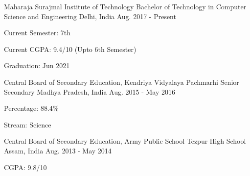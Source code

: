 

\begin{cventries}

  \cventry
    {Maharaja Surajmal Institute of Technology} %
    {Bachelor of Technology in Computer Science and Engineering} %
    {Delhi, India} %
    {Aug. 2017 - Present} %
    {
      \begin{cvitems} %
        \item {Current Semester: 7th}
        \item {Current CGPA: 9.4/10 (Upto 6th Semester)}
        \item {Graduation: Jun 2021}
      \end{cvitems}
    }

  \cventry
    {Central Board of Secondary Education, Kendriya Vidyalaya Pachmarhi} %
    {Senior Secondary} %
    {Madhya Pradesh, India} %
    {Aug. 2015 - May 2016} %
    {
      \begin{cvitems} %
        \item {Percentage: 88.4\%}
        \item {Stream: Science}
      \end{cvitems}
    }

  \cventry
    {Central Board of Secondary Education, Army Public School Tezpur} %
    {High School} %
    {Assam, India} %
    {Aug. 2013 - May 2014} %
    {
      \begin{cvitems} %
        \item {CGPA: 9.8/10}
      \end{cvitems}
    }
    
\end{cventries}
